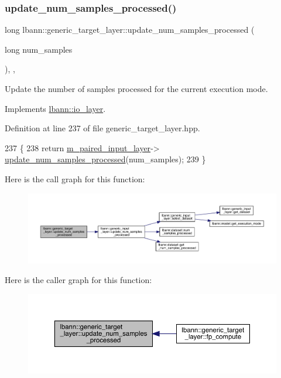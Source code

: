 \subsubsection{\texorpdfstring{update\+\_\+num\+\_\+samples\+\_\+processed()}{update\_num\_samples\_processed()}}
{\footnotesize\ttfamily long lbann\+::generic\+\_\+target\+\_\+layer\+::update\+\_\+num\+\_\+samples\+\_\+processed (\begin{DoxyParamCaption}\item[{long}]{num\+\_\+samples }\end{DoxyParamCaption})\hspace{0.3cm}{\ttfamily [inline]}, {\ttfamily [override]}, {\ttfamily [virtual]}}

Update the number of samples processed for the current execution mode. 

Implements \hyperlink{classlbann_1_1io__layer_a4ed831842ad78aaebfc9519c51268b95}{lbann\+::io\+\_\+layer}.



Definition at line 237 of file generic\+\_\+target\+\_\+layer.\+hpp.


\begin{DoxyCode}
237                                                                \{
238     \textcolor{keywordflow}{return} \hyperlink{classlbann_1_1generic__target__layer_a84da1260e9feb4fbc3e6f2315e4cab4b}{m\_paired\_input\_layer}->
      \hyperlink{classlbann_1_1generic__input__layer_a0c2f123432ec6af168012cc8699a1d3f}{update\_num\_samples\_processed}(num\_samples);
239   \}
\end{DoxyCode}
Here is the call graph for this function\+:\nopagebreak
\begin{figure}[H]
\begin{center}
\leavevmode
\includegraphics[width=350pt]{classlbann_1_1generic__target__layer_a0dbe5fc5203e15ddcf8348daf2f697c5_cgraph}
\end{center}
\end{figure}
Here is the caller graph for this function\+:\nopagebreak
\begin{figure}[H]
\begin{center}
\leavevmode
\includegraphics[width=350pt]{classlbann_1_1generic__target__layer_a0dbe5fc5203e15ddcf8348daf2f697c5_icgraph}
\end{center}
\end{figure}


